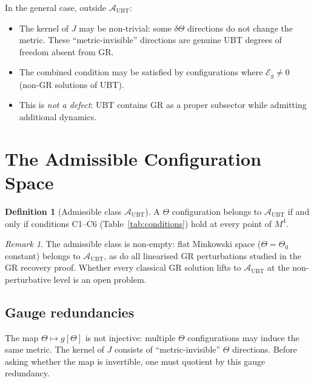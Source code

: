 \documentclass[12pt]{article}
\theoremstyle{definition}
\newtheorem{definition}[theorem]{Definition}
\theoremstyle{remark}
\newtheorem{remark}[theorem]{Remark}
\begin{document}
In the general case, outside $\mathcal{A}_{\mathrm{UBT}}$:
\begin{itemize}
  \item The kernel of $J$ may be non-trivial: some $\delta\Theta$ directions
    do not change the metric.  These ``metric-invisible'' directions are
    genuine UBT degrees of freedom absent from GR.
  \item The combined condition may be satisfied by configurations where
    $\mathcal{E}_g \neq 0$ (non-GR solutions of UBT).
  \item This is \emph{not a defect}: UBT contains GR as a proper subsector
    while admitting additional dynamics.
\end{itemize}

\section{The Admissible Configuration Space}
\label{sec:admissible}

\begin{definition}[Admissible class $\mathcal{A}_{\mathrm{UBT}}$]
\label{def:admissible}
A $\Theta$ configuration belongs to $\mathcal{A}_{\mathrm{UBT}}$ if and only
if conditions C1--C6 (Table~\ref{tab:conditions}) hold at every point of $M^4$.
\end{definition}

\begin{remark}
The admissible class is non-empty: flat Minkowski space ($\Theta = \Theta_0$
constant) belongs to $\mathcal{A}_{\mathrm{UBT}}$, as do all linearised GR
perturbations studied in the GR recovery proof.  Whether every classical GR
solution lifts to $\mathcal{A}_{\mathrm{UBT}}$ at the non-perturbative level
is an open problem.
\end{remark}

\subsection{Gauge redundancies}

The map $\Theta \mapsto g[\Theta]$ is not injective: multiple $\Theta$
configurations may induce the same metric.  The kernel of $J$ consists of
``metric-invisible'' $\Theta$ directions.  Before asking whether the map is
invertible, one must quotient by this gauge redundancy.
\end{document}
